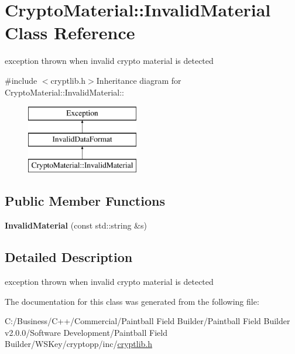 \hypertarget{class_crypto_material_1_1_invalid_material}{
\section{CryptoMaterial::InvalidMaterial Class Reference}
\label{class_crypto_material_1_1_invalid_material}
}


exception thrown when invalid crypto material is detected  


{\ttfamily \#include $<$cryptlib.h$>$}Inheritance diagram for CryptoMaterial::InvalidMaterial::\begin{figure}[H]
\begin{center}
\leavevmode
\includegraphics[height=3cm]{class_crypto_material_1_1_invalid_material}
\end{center}
\end{figure}
\subsection*{Public Member Functions}
\begin{DoxyCompactItemize}
\item 
\hypertarget{class_crypto_material_1_1_invalid_material_a71bd4ca874fcac405019fb3df4b3820a}{
{\bfseries InvalidMaterial} (const std::string \&s)}
\label{class_crypto_material_1_1_invalid_material_a71bd4ca874fcac405019fb3df4b3820a}

\end{DoxyCompactItemize}


\subsection{Detailed Description}
exception thrown when invalid crypto material is detected 

The documentation for this class was generated from the following file:\begin{DoxyCompactItemize}
\item 
C:/Business/C++/Commercial/Paintball Field Builder/Paintball Field Builder v2.0.0/Software Development/Paintball Field Builder/WSKey/cryptopp/inc/\hyperlink{cryptlib_8h}{cryptlib.h}\end{DoxyCompactItemize}
